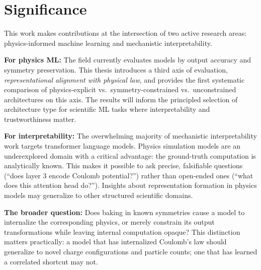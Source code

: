 \documentclass[12pt]{article}
\begin{document}
\section{Significance}

This work makes contributions at the intersection of two active research areas:
physics-informed machine learning and mechanistic interpretability.

\textbf{For physics ML:} The field currently evaluates models by output accuracy
and symmetry preservation. This thesis introduces a third axis of evaluation,
\textit{representational alignment with physical law}, and provides the first
systematic comparison of physics-explicit vs.\ symmetry-constrained vs.\
unconstrained architectures on this axis. The results will inform the principled
selection of architecture type for scientific ML tasks where interpretability
and trustworthiness matter.

\textbf{For interpretability:} The overwhelming majority of mechanistic
interpretability work targets transformer language models. Physics simulation
models are an underexplored domain with a critical advantage: the ground-truth
computation is analytically known. This makes it possible to ask precise,
falsifiable questions (``does layer 3 encode Coulomb potential?'') rather than
open-ended ones (``what does this attention head do?''). Insights about
representation formation in physics models may generalize to other structured
scientific domains.

\textbf{The broader question:} Does baking in known symmetries cause a model to
internalize the corresponding physics, or merely constrain its output
transformations while leaving internal computation opaque? This distinction
matters practically: a model that has internalized Coulomb's law should
generalize to novel charge configurations and particle counts; one that has
learned a correlated shortcut may not.



\end{document}
